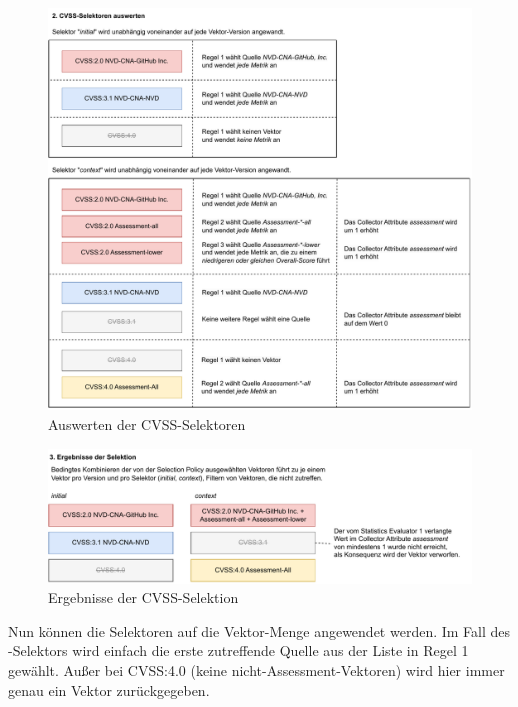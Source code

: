 \begin{figure}[htbp] %
    \centering
    \includegraphics[width=1\textwidth, keepaspectratio]{res/grafiken/cvss-selection-process-selection-2}
    \caption{Auswerten der CVSS-Selektoren}
    \label{fig:cvss-selection-process-selection-2}
\end{figure}

\begin{figure}[htbp] %
    \centering
    \includegraphics[width=1\textwidth, keepaspectratio]{res/grafiken/cvss-selection-process-selection-3}
    \caption{Ergebnisse der CVSS-Selektion}
    \label{fig:cvss-selection-process-selection-3}
\end{figure}

Nun können die Selektoren auf die Vektor-Menge angewendet werden.
Im Fall des -Selektors wird einfach die erste zutreffende Quelle aus der Liste in Regel 1 gewählt.
Außer bei CVSS:4.0 (keine nicht-Assessment-Vektoren) wird hier immer genau ein Vektor zurückgegeben.

